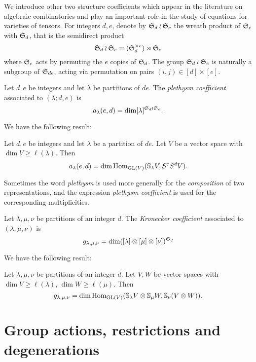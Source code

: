 We introduce other two structure coefficients which appear in the literature on algebraic combinatorics and play an important role in the study of equations for varieties of tensors. For integers $d,e$, denote by $\mathfrak{S}_d \wr \mathfrak{S}_e$ the wreath product of $\mathfrak{S}_e$ with $\mathfrak{S}_d$, that is the semidirect product
\[
\mathfrak{S}_d \wr \mathfrak{S}_e = (\mathfrak{S}_d ^{\times e}) \rtimes \mathfrak{S}_e
\]
where $\mathfrak{S}_e$ acts by permuting the $e$ copies of $\mathfrak{S}_d$. The group $\mathfrak{S}_d \wr \mathfrak{S}_e $ is naturally a subgroup of $\mathfrak{S}_{de}$, acting via permutation on pairs $(i,j) \in [d] \times [e]$.
\begin{definition}
 \label{introduction-definition-plethysm}
 Let $d,e$ be integers and let $\lambda$ be partitions of $de$. The {\it plethysm coefficient} associated to $(\lambda;d,e)$ is
 \[
a_\lambda(e,d) = \dim [\lambda]^{\mathfrak{S}_d \wr \mathfrak{S}_e}.
\]
\end{definition}
We have the following result:
\begin{lemma}
 \label{introduction-lemma-plethysmGL}
 Let $d,e$ be integers and let $\lambda$ be a partition of $de$. Let $V$ be a vector space with $\dim V \geq \ell(\lambda)$. Then
 \[
 a_\lambda(e,d) = \dim \operatorname{Hom}_{\mathrm{GL}(V)} ( \mathbb{S}_\lambda V , S^e S^d V).
 \]
\end{lemma}
Sometimes the word \emph{plethysm} is used more generally for the \emph{composition} of two representations, and the expression \emph{plethysm coefficient} is used for the corresponding multiplicities.


\begin{definition}
 \label{introduction-definition-kroncoefficient}
 Let $\lambda,\mu,\nu$ be partitions of an integer $d$. The {\it Kronecker coefficient} associated to $(\lambda,\mu,\nu)$ is 
 \[
 g_{\lambda,\mu,\nu} = \dim ([\lambda] \otimes [\mu] \otimes [\nu])^{\mathfrak{S}_d}
 \]
\end{definition}
We have the following result:
\begin{lemma}
 \label{introduction-lemma-kroncoefficientGL}
 Let $\lambda,\mu,\nu$ be partitions of an integer $d$. Let $V,W$ be vector spaces with $\dim V \geq \ell(\lambda)$, $\dim W \geq \ell(\mu)$. Then 
 \[
 g_{\lambda,\mu,\nu} = \dim \operatorname{Hom}_{\mathrm{GL}(V)} ( \mathbb{S}_\lambda V \otimes \mathbb{S}_\mu W , \mathbb{S}_\nu(V \otimes W)).
 \]
\end{lemma}


\section{Group actions, restrictions and degenerations}
\label{introduction-section-groupactions}

